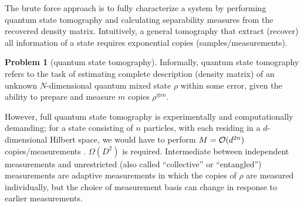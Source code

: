 \documentclass[
reprint,
aps,
pra,
floatfix,
]{revtex4-2}
\theoremstyle{plain}
\theoremstyle{definition}
\newtheorem{problem}{Problem}
\newcommand{\dm}{\rho}
\newcommand{\sx}{\hat{\sigma}_x}
\newcommand{\sy}{\hat{\sigma}_y}
\newcommand{\sz}{\hat{\sigma}_z}
\begin{document}
The brute force approach is to fully characterize a system by performing quantum state tomography and calculating separability measures from the recovered density matrix.
Intuitively, a general tomography \cite{altepeterPhotonicStateTomography2005} that extract (recover) all information of a state requires exponential copies (samples/measurements).
\begin{problem}[quantum state tomography]\label{prm:full_tomography}
	Informally, quantum state tomography refers to the task of estimating complete description (density matrix) of an unknown $N$-dimensional quantum mixed state $\dm$ within some error, 
	given the ability to prepare and measure $m$ copies $\dm^{\otimes m}$.
\end{problem}
However, full quantum state tomography is experimentally and computationally demanding; for a state consisting of $n$ particles, with each residing in a $d$-dimensional Hilbert space, we would have to perform $M = \mathcal{O}(d^{2n})$ copies/measurements \cite{haahSampleoptimalTomographyQuantum2017}. 
$\Omega(D^2)$ is required.
Intermediate between independent measurements and unrestricted (also called “collective” or “entangled”) measurements are adaptive measurements in which the copies of $\dm$ are measured individually, but the choice of measurement basis can change in response to earlier measurements.
\end{document}
